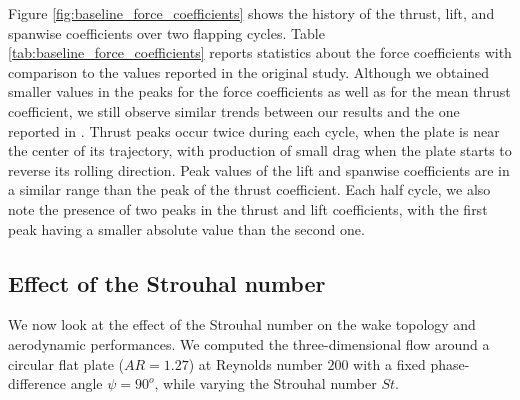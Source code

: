 Figure \ref{fig:baseline_force_coefficients} shows the history of the thrust, lift, and spanwise coefficients over two flapping cycles.
Table \ref{tab:baseline_force_coefficients} reports statistics about the force coefficients with comparison to the values reported in the original study.
Although we obtained smaller values in the peaks for the force coefficients as well as for the mean thrust coefficient, we still observe similar trends between our results and the one reported in \citet{li_dong_2016}.
Thrust peaks occur twice during each cycle, when the plate is near the center of its trajectory, with production of small drag when the plate starts to reverse its rolling direction.
Peak values of the lift and spanwise coefficients are in a similar range than the peak of the thrust coefficient.
Each half cycle, we also note the presence of two peaks in the thrust and lift coefficients, with the first peak having a smaller absolute value than the second one.

\subsection{Effect of the Strouhal number}

We now look at the effect of the Strouhal number on the wake topology and aerodynamic performances.
We computed the three-dimensional flow around a circular flat plate ($AR = 1.27$) at Reynolds number $200$ with a fixed phase-difference angle $\psi = 90^o$, while varying the Strouhal number $St$.

